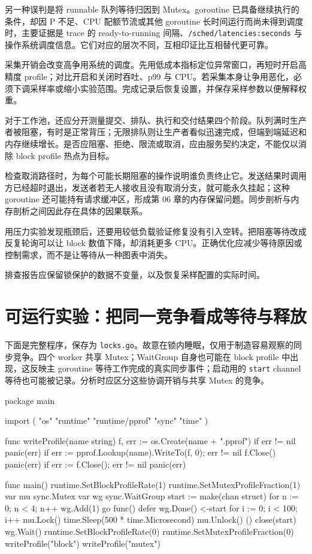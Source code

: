 \documentclass[UTF8,fontset=fandol,openany,11pt]{ctexbook}
\begin{document}
另一种误判是将 runnable 队列等待归因到 Mutex。goroutine 已具备继续执行的条件，却因 P 不足、CPU 配额节流或其他 goroutine 长时间运行而尚未得到调度时，主要证据是 trace 的 ready-to-running 间隔、\texttt{/\allowbreak{}sched/\allowbreak{}latencies:\allowbreak{}seconds} 与操作系统调度信息。它们对应的层次不同，互相印证比互相替代更可靠。\cite{tools-metrics}

采集开销会改变高争用系统的调度。先用低成本指标定位异常窗口，再短时开启高精度 profile；对比开启和关闭时吞吐、p99 与 CPU。若采集本身让争用恶化，必须下调采样率或缩小实验范围。完成记录后恢复设置，并保存采样参数以便解释权重。

对于工作池，还应分开测量提交、排队、执行和交付结果四个阶段。队列满时生产者被阻塞，有时是正常背压；无限排队则让生产者看似迅速完成，但端到端延迟和内存继续增长。是否应阻塞、拒绝、限流或取消，应由服务契约决定，不能仅以消除 block profile 热点为目标。

检查取消路径时，为每个可能长期阻塞的操作说明谁负责终止它。发送结果时调用方已经超时退出，发送者若无人接收且没有取消分支，就可能永久挂起；这种 goroutine 还可能持有请求缓冲区，形成第 06 章的内存保留问题。同步剖析与内存剖析之间因此存在具体的因果联系。

用压力实验发现瓶颈后，还要用较低负载验证修复没有引入空转。把阻塞等待改成反复轮询可以让 block 数值下降，却消耗更多 CPU。正确优化应减少等待原因或控制需求，而不是让等待从一种图表中消失。

排查报告应保留锁保护的数据不变量，以及恢复采样配置的实际时间。

\section{可运行实验：把同一竞争看成等待与释放}
下面是完整程序，保存为 \texttt{locks.\allowbreak{}go}。故意在锁内睡眠，仅用于制造容易观察的同步竞争。四个 worker 共享 Mutex；WaitGroup 自身也可能在 block profile 中出现，这反映主 goroutine 等待工作完成的真实同步事件；启动用的 \texttt{start} channel 等待也可能被记录。分析时应区分这些协调开销与共享 Mutex 的竞争。

\begin{codeblock}
package main

import (
	"os"
	"runtime"
	"runtime/pprof"
	"sync"
	"time"
)

func writeProfile(name string) {
	f, err := os.Create(name + ".pprof")
	if err != nil {
		panic(err)
	}
	if err := pprof.Lookup(name).WriteTo(f, 0); err != nil {
		f.Close()
		panic(err)
	}
	if err := f.Close(); err != nil {
		panic(err)
	}
}

func main() {
	runtime.SetBlockProfileRate(1)
	runtime.SetMutexProfileFraction(1)
	var mu sync.Mutex
	var wg sync.WaitGroup
	start := make(chan struct{})
	for n := 0; n < 4; n++ {
		wg.Add(1)
		go func() {
			defer wg.Done()
			<-start
			for i := 0; i < 100; i++ {
				mu.Lock()
				time.Sleep(500 * time.Microsecond)
				mu.Unlock()
			}
		}()
	}
	close(start)
	wg.Wait()
	runtime.SetBlockProfileRate(0)
	runtime.SetMutexProfileFraction(0)
	writeProfile("block")
	writeProfile("mutex")
}
\end{codeblock}
\end{document}
